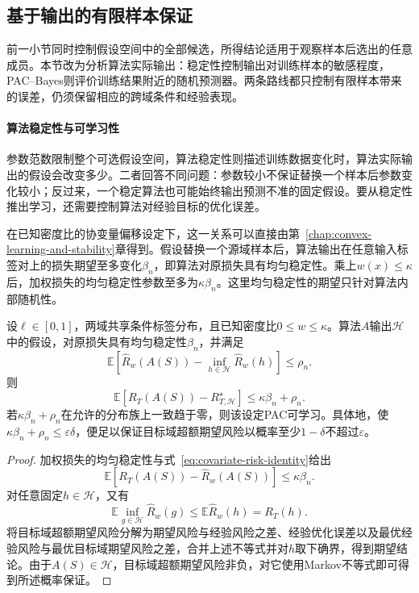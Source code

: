 \subsection{基于输出的有限样本保证}
\label{sec:transfer-stability}
\label{sec:adaptation-output-bounds}

前一小节同时控制假设空间中的全部候选，所得结论适用于观察样本后选出的任意成员。本节改为分析算法实际输出：稳定性控制输出对训练样本的敏感程度，PAC--Bayes则评价训练结果附近的随机预测器。两条路线都只控制有限样本带来的误差，仍须保留相应的跨域条件和经验表现。

\paragraph{算法稳定性与可学习性}

参数范数限制整个可选假设空间，算法稳定性则描述训练数据变化时，算法实际输出的假设会改变多少。二者回答不同问题：参数较小不保证替换一个样本后参数变化较小；反过来，一个稳定算法也可能始终输出预测不准的固定假设。要从稳定性推出学习，还需要控制算法对经验目标的优化误差。

在已知密度比的协变量偏移设定下，这一关系可以直接由第~\ref{chap:convex-learning-and-stability}章得到。假设替换一个源域样本后，算法输出在任意输入标签对上的损失期望至多变化$\beta_n$，即算法对原损失具有均匀稳定性。乘上$w(x)\leq\kappa$后，加权损失的均匀稳定性参数至多为$\kappa\beta_n$。这里均匀稳定性的期望只针对算法内部随机性。

\begin{theorem}[稳定性条件下的迁移可学习性]
\label{thm:transfer-stability-learning}
设$\ell\in[0,1]$，两域共享条件标签分布，且已知密度比$0\leq w\leq\kappa$。算法$A$输出$\mathcal H$中的假设，对原损失具有均匀稳定性$\beta_n$，并满足
\[
 \mathbb E\!\left[\hat R_w(A(S))-
                  \inf_{h\in\mathcal H}\hat R_w(h)\right]
 \leq\rho_n.
\]
则
\begin{equation}
 \mathbb E[R_T(A(S))-R_{T,\mathcal H}^{\star}]
 \leq\kappa\beta_n+\rho_n.
 \label{eq:transfer-stability-excess}
\end{equation}
若$\kappa\beta_n+\rho_n$在允许的分布族上一致趋于零，则该设定PAC可学习。具体地，使$\kappa\beta_n+\rho_n\leq\varepsilon\delta$，便足以保证目标域超额期望风险以概率至少$1-\delta$不超过$\varepsilon$。
\end{theorem}
\begin{proof}
加权损失的均匀稳定性与式~\eqref{eq:covariate-risk-identity}给出
\[
 \mathbb E[R_T(A(S))-\hat R_w(A(S))]\leq\kappa\beta_n.
\]
对任意固定$h\in\mathcal H$，又有
\[
 \mathbb E\inf_{g\in\mathcal H}\hat R_w(g)
 \leq\mathbb E\hat R_w(h)=R_T(h).
\]
将目标域超额期望风险分解为期望风险与经验风险之差、经验优化误差以及最优经验风险与最优目标域期望风险之差，合并上述不等式并对$h$取下确界，得到期望结论。由于$A(S)\in\mathcal H$，目标域超额期望风险非负，对它使用Markov不等式即可得到所述概率保证。
\end{proof}

